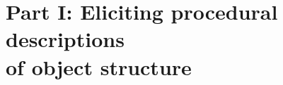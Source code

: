 \documentclass[10pt,letterpaper]{article}
\begin{document}

\section{Part I: Eliciting procedural descriptions \\ of object structure} \label{sec-part-i}



\end{document}
